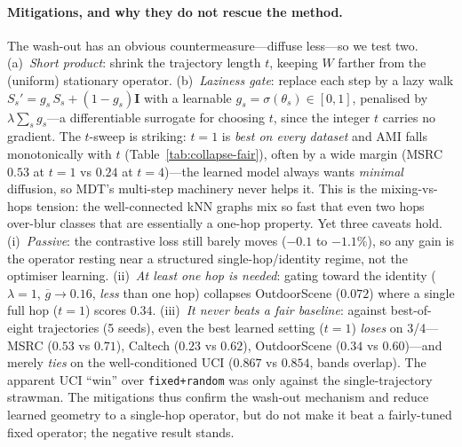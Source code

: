 \documentclass[10pt,twocolumn]{article}
\begin{document}
\begin{table}[t]\centering\footnotesize
\caption{End-to-end learning of the geometry (learned kernels + weights) fails, worse than fixed
operators. AMI. The failure is optimisation/conditioning (flat loss, spectrum flattening), not the
rank-one collapse the numbers might suggest---see text.}
\label{tab:collapse}
\setlength{\tabcolsep}{5pt}
\end{table}

\paragraph{Mitigations, and why they do not rescue the method.}
The wash-out has an obvious countermeasure---diffuse less---so we test two. (a)~\emph{Short product}:
shrink the trajectory length $t$, keeping $W$ farther from the (uniform) stationary operator.
(b)~\emph{Laziness gate}: replace each step by a lazy walk $S_s'=g_s\,S_s+(1-g_s)\mathbf I$ with a
learnable $g_s=\sigma(\theta_s)\in[0,1]$, penalised by $\lambda\sum_s g_s$---a differentiable surrogate
for choosing $t$, since the integer $t$ carries no gradient. The $t$-sweep is striking:
$t{=}1$ is \emph{best on every dataset} and AMI falls monotonically with $t$
(Table~\ref{tab:collapse-fair}), often by a wide margin (MSRC $0.53$ at $t{=}1$ vs $0.24$ at
$t{=}4$)---the learned model always wants \emph{minimal} diffusion,
so MDT's multi-step machinery never helps it. This is the mixing-vs-hops tension: the well-connected
kNN graphs mix so fast that even two hops over-blur classes that are essentially a one-hop property.
Yet three caveats hold. (i)~\emph{Passive}: the contrastive loss still barely moves ($-0.1$ to
$-1.1\%$), so any gain is the operator resting near a structured single-hop/identity regime, not the
optimiser learning. (ii)~\emph{At least one hop is needed}: gating toward the identity ($\lambda{=}1$,
$\overline g\!\to\!0.16$, \emph{less} than one hop) collapses OutdoorScene ($0.072$) where a single
full hop ($t{=}1$) scores $0.34$. (iii)~\emph{It never beats a fair baseline}: against best-of-eight
trajectories (5 seeds), even the best learned setting ($t{=}1$) \emph{loses} on 3/4---MSRC ($0.53$ vs
$0.71$), Caltech ($0.23$ vs $0.62$), OutdoorScene ($0.34$ vs $0.60$)---and merely \emph{ties} on the
well-conditioned UCI ($0.867$ vs $0.854$, bands overlap). The apparent UCI ``win'' over
\texttt{fixed+random} was only against the single-trajectory strawman. The mitigations thus confirm the
wash-out mechanism and reduce learned geometry to a single-hop operator, but do not make it beat a
fairly-tuned fixed operator; the negative result stands.
\end{document}
